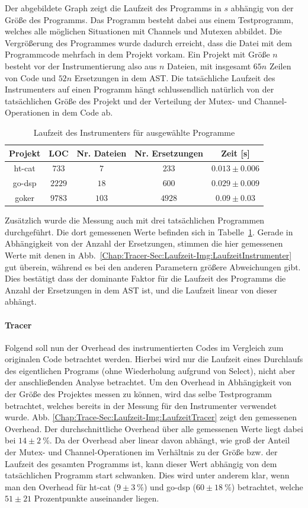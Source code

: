 Der abgebildete Graph zeigt die Laufzeit des Programms in $s$ abhängig von der 
Größe des Programms. Das Programm besteht dabei aus einem Testprogramm, welches 
alle möglichen Situationen mit Channels und Mutexen abbildet. Die Vergrößerung 
des Programmes wurde dadurch erreicht, dass die Datei mit dem Programmcode 
mehrfach in dem Projekt vorkam. Ein Projekt mit Größe $n$ besteht vor der 
Instrumentierung also 
aus $n$ Dateien, mit insgesamt $65n$ Zeilen von Code und $52n$ Ersetzungen
in dem AST. Die tatsächliche Laufzeit des Instrumenters auf einen 
Programm hängt schlussendlich natürlich von der tatsächlichen Größe des 
Projekt und der Verteilung der Mutex- und Channel-Operationen in dem Code ab.\\
\begin{table}[!h]
  \centering
  \begin{tabular}{|c|c|c|c|c|}
  \hline
  Projekt & LOC & Nr. Dateien & Nr. Ersetzungen & Zeit {[}s{]} \\ \hline
  ht-cat & $733$ & $7$ & $233$ & $0.013 \pm 0.006$ \\ \hline
  go-dsp & $2229$ & $18$ & $600$ & $0.029 \pm 0.009$ \\ \hline
  goker & $9783$ & $103$ & $4928$ & $0.09 \pm 0.03$ \\ \hline
  \end{tabular}
  \caption{Laufzeit des Instrumenters für ausgewählte Programme}
  \label{Chap:Tracer-Sec:Laufzeit-Tab:LaufzeitInstrumenter}
\end{table}
Zusätzlich wurde die Messung auch mit drei tatsächlichen Programmen 
durchgeführt. Die dort gemessenen Werte befinden sich in 
Tabelle~\ref{Chap:Tracer-Sec:Laufzeit-Tab:LaufzeitInstrumenter}. Gerade in 
Abhängigkeit von der Anzahl der Ersetzungen, stimmen die hier gemessenen Werte
mit denen in Abb.~\ref{Chap:Tracer-Sec:Laufzeit-Img:LaufzeitInstrumenter} gut 
überein, während es bei den anderen Parametern größere Abweichungen gibt.
Dies bestätigt dass der dominante Faktor für die Laufzeit des Programms 
die Anzahl der Ersetzungen in dem AST ist, und die Laufzeit linear von dieser 
abhängt.
\paragraph{Tracer} Folgend soll nun der Overhead des instrumentierten Codes 
im Vergleich zum originalen Code betrachtet werden.
Hierbei wird nur die Laufzeit eines Durchlaufs des eigentlichen Programs
(ohne Wiederholung aufgrund von Select), 
nicht aber der anschließenden 
Analyse betrachtet. Um den Overhead in Abhängigkeit von der Größe des Projektes messen 
zu können, wird das selbe Testprogramm betrachtet, welches bereits in der Messung 
für den Instrumenter verwendet wurde. Abb. \ref{Chap:Trace-Sec:Laufzeit-Img:LaufzeitTracer}
zeigt den gemessenen Overhead. Der durchschnittliche Overhead über alle gemessenen Werte 
liegt dabei bei $14 \pm 2\ \%$. Da der Overhead aber linear davon abhängt, 
wie groß der Anteil der Mutex- und Channel-Operationen im Verhältnis zu 
der Größe bzw. der Laufzeit des gesamten Programms ist, kann dieser Wert abhängig 
von dem tatsächlichen Programm start schwanken. Dies wird unter anderem klar, wenn man 
den Overhead für ht-cat ($9 \pm 3\ \%$) und go-dsp ($60\pm 18\ \%$) betrachtet, welche $51 \pm 21$ 
Prozentpunkte auseinander liegen. 
